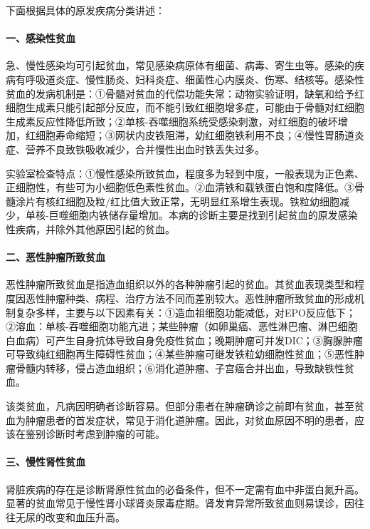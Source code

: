 下面根据具体的原发疾病分类讲述：

\paragraph{一、感染性贫血}

急、慢性感染均可引起贫血，常见感染病原体有细菌、病毒、寄生虫等。感染的疾病有呼吸道炎症、慢性肠炎、妇科炎症、细菌性心内膜炎、伤寒、结核等。感染性贫血的发病机制是：①骨髓对贫血的代偿功能失常：动物实验证明，缺氧和给予红细胞生成素只能引起部分反应，而不能引致红细胞增多症，可能由于骨髓对红细胞生成素反应性降低所致；②单核-吞噬细胞系统受感染刺激，对红细胞的破坏增加，红细胞寿命缩短；③网状内皮铁阻滞，幼红细胞铁利用不良；④慢性胃肠道炎症、营养不良致铁吸收减少，合并慢性出血时铁丢失过多。

实验室检查特点：①慢性感染所致贫血，程度多为轻到中度，一般表现为正色素、正细胞性，有些可为小细胞低色素性贫血。②血清铁和载铁蛋白饱和度降低。③骨髓涂片有核红细胞及粒/红比值大致正常，无明显红系增生表现。铁粒幼细胞减少，单核-巨噬细胞内铁储存量增加。本病的诊断主要是找到引起贫血的原发感染性疾病，并除外其他原因引起的贫血。

\paragraph{二、恶性肿瘤所致贫血}

恶性肿瘤所致贫血是指造血组织以外的各种肿瘤引起的贫血。其贫血表现类型和程度因恶性肿瘤种类、病程、治疗方法不同而差别较大。恶性肿瘤所致贫血的形成机制复杂多样，主要与以下因素有关：①造血祖细胞功能减低，对EPO反应低下；②溶血：单核-吞噬细胞功能亢进；某些肿瘤（如卵巢癌、恶性淋巴瘤、淋巴细胞白血病）可产生自身抗体导致自身免疫性贫血；晚期肿瘤可并发DIC；③胸腺肿瘤可导致纯红细胞再生障碍性贫血；④某些肿瘤可继发铁粒幼细胞性贫血；⑤恶性肿瘤骨髓内转移，侵占造血组织；⑥消化道肿瘤、子宫癌合并出血，导致缺铁性贫血。

该类贫血，凡病因明确者诊断容易。但部分患者在肿瘤确诊之前即有贫血，甚至贫血为肿瘤患者的首发症状，常见于消化道肿瘤。因此，对贫血原因不明的患者，应该在鉴别诊断时考虑到肿瘤的可能。

\paragraph{三、慢性肾性贫血}

肾脏疾病的存在是诊断肾原性贫血的必备条件，但不一定需有血中非蛋白氮升高。显著的贫血常见于慢性肾小球肾炎尿毒症期。肾发育异常所致贫血则易误诊，因往往无尿的改变和血压升高。

